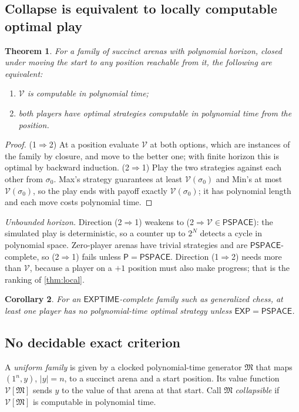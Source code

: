 \documentclass[11pt]{amsart}
\theoremstyle{plain}
\newtheorem{theorem}{Theorem}[section]
\newtheorem{corollary}[theorem]{Corollary}
\theoremstyle{definition}
\theoremstyle{remark}
\numberwithin{equation}{section}
\newcommand{\val}{\mathcal{V}}            %
\newcommand{\cls}[1]{\mathsf{#1}}
\newcommand{\PSPACE}{\cls{PSPACE}}
\newcommand{\EXP}{\cls{EXP}}
\newcommand{\EXPTIME}{\cls{EXPTIME}}
\newcommand{\Pclass}{\cls{P}}
\begin{document}
\subsection{Collapse is equivalent to locally computable optimal play}
\begin{theorem}\label{thm:strategies}
For a family of succinct arenas with polynomial horizon, closed under moving the start to any position reachable from it, the following are equivalent:
\begin{enumerate}[label=\textup{(\arabic*)}]
\item $\val$ is computable in polynomial time;
\item both players have optimal strategies computable in polynomial time from the position.
\end{enumerate}
\end{theorem}
\begin{proof}
(1$\Rightarrow$2) At a position evaluate $\val$ at both options, which are instances of the family by closure, and move to the better one; with finite horizon this is optimal by backward induction. (2$\Rightarrow$1) Play the two strategies against each other from $\sigma_0$. Max's strategy guarantees at least $\val(\sigma_0)$ and Min's at most $\val(\sigma_0)$, so the play ends with payoff exactly $\val(\sigma_0)$; it has polynomial length and each move costs polynomial time.
\end{proof}

\noindent\emph{Unbounded horizon.} Direction (2$\Rightarrow$1) weakens to (2$\Rightarrow\val\in\PSPACE$): the simulated play is deterministic, so a counter up to $2^N$ detects a cycle in polynomial space. Zero-player arenas have trivial strategies and are $\PSPACE$-complete, so (2$\Rightarrow$1) fails unless $\Pclass=\PSPACE$. Direction (1$\Rightarrow$2) needs more than $\val$, because a player on a $+1$ position must also make progress; that is the ranking of \cref{thm:local}.

\begin{corollary}\label{cor:chess}
For an $\EXPTIME$-complete family such as generalized chess, at least one player has no polynomial-time optimal strategy unless $\EXP=\PSPACE$.
\end{corollary}

\subsection{No decidable exact criterion}
A \emph{uniform family} is given by a clocked polynomial-time generator $\mathfrak M$ that maps $(1^n,y)$, $|y|=n$, to a succinct arena and a start position. Its value function $\val[\mathfrak M]$ sends $y$ to the value of that arena at that start. Call $\mathfrak M$ \emph{collapsible} if $\val[\mathfrak M]$ is computable in polynomial time.
\end{document}

